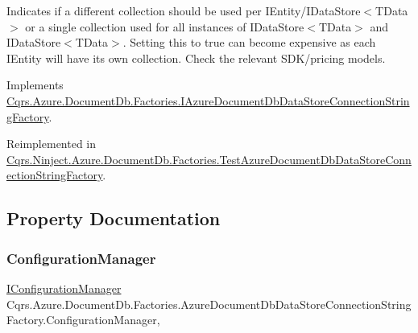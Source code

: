 Indicates if a different collection should be used per I\+Entity/I\+Data\+Store$<$\+T\+Data$>$ or a single collection used for all instances of I\+Data\+Store$<$\+T\+Data$>$ and I\+Data\+Store$<$\+T\+Data$>$. Setting this to true can become expensive as each I\+Entity will have it\textquotesingle{}s own collection. Check the relevant S\+D\+K/pricing models. 



Implements \hyperlink{interfaceCqrs_1_1Azure_1_1DocumentDb_1_1Factories_1_1IAzureDocumentDbDataStoreConnectionStringFactory_ae500b0191fee202806701e4f856c43dd_ae500b0191fee202806701e4f856c43dd}{Cqrs.\+Azure.\+Document\+Db.\+Factories.\+I\+Azure\+Document\+Db\+Data\+Store\+Connection\+String\+Factory}.



Reimplemented in \hyperlink{classCqrs_1_1Ninject_1_1Azure_1_1DocumentDb_1_1Factories_1_1TestAzureDocumentDbDataStoreConnectionStringFactory_aeac8ecfdbb2d1d7f18105f2e535c51fe_aeac8ecfdbb2d1d7f18105f2e535c51fe}{Cqrs.\+Ninject.\+Azure.\+Document\+Db.\+Factories.\+Test\+Azure\+Document\+Db\+Data\+Store\+Connection\+String\+Factory}.



\subsection{Property Documentation}
\mbox{\label{classCqrs_1_1Azure_1_1DocumentDb_1_1Factories_1_1AzureDocumentDbDataStoreConnectionStringFactory_a7d0a40bb03e9e15306023bf97094cf60_a7d0a40bb03e9e15306023bf97094cf60}} 
\subsubsection{\texorpdfstring{Configuration\+Manager}{ConfigurationManager}}
{\footnotesize\ttfamily \hyperlink{interfaceCqrs_1_1Configuration_1_1IConfigurationManager}{I\+Configuration\+Manager} Cqrs.\+Azure.\+Document\+Db.\+Factories.\+Azure\+Document\+Db\+Data\+Store\+Connection\+String\+Factory.\+Configuration\+Manager\hspace{0.3cm}{\ttfamily [get]}, {\ttfamily [protected]}}

